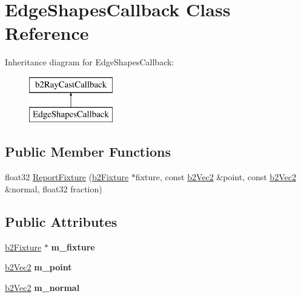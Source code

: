 \hypertarget{class_edge_shapes_callback}{\section{Edge\-Shapes\-Callback Class Reference}
\label{class_edge_shapes_callback}
}
Inheritance diagram for Edge\-Shapes\-Callback\-:\begin{figure}[H]
\begin{center}
\leavevmode
\includegraphics[height=2.000000cm]{class_edge_shapes_callback}
\end{center}
\end{figure}
\subsection*{Public Member Functions}
\begin{DoxyCompactItemize}
\item 
float32 \hyperlink{class_edge_shapes_callback_ad2a2a976f5bfe944ed38cb357a68faad}{Report\-Fixture} (\hyperlink{classb2_fixture}{b2\-Fixture} $\ast$fixture, const \hyperlink{structb2_vec2}{b2\-Vec2} \&point, const \hyperlink{structb2_vec2}{b2\-Vec2} \&normal, float32 fraction)
\end{DoxyCompactItemize}
\subsection*{Public Attributes}
\begin{DoxyCompactItemize}
\item 
\hypertarget{class_edge_shapes_callback_ade2ba6a296bdb0f74444d07da25e4ebc}{\hyperlink{classb2_fixture}{b2\-Fixture} $\ast$ {\bfseries m\-\_\-fixture}}\label{class_edge_shapes_callback_ade2ba6a296bdb0f74444d07da25e4ebc}

\item 
\hypertarget{class_edge_shapes_callback_a62ba065a5d66af3b197a0cabbdfc72aa}{\hyperlink{structb2_vec2}{b2\-Vec2} {\bfseries m\-\_\-point}}\label{class_edge_shapes_callback_a62ba065a5d66af3b197a0cabbdfc72aa}

\item 
\hypertarget{class_edge_shapes_callback_a38a405b43935b5d67e734387eda85b08}{\hyperlink{structb2_vec2}{b2\-Vec2} {\bfseries m\-\_\-normal}}\label{class_edge_shapes_callback_a38a405b43935b5d67e734387eda85b08}

\end{DoxyCompactItemize}



